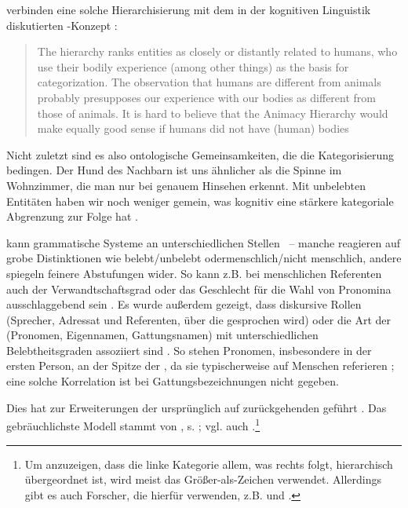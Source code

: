  \noindent
\textcite{Enger2011} verbinden eine solche Hierarchisierung mit dem in der kognitiven Linguistik diskutierten  -Konzept \parencite[vgl.][]{Lakoff1999}:
\blockcquote[208]{Enger2011}[.]{The hierarchy ranks entities as
closely or distantly related to humans, who use their bodily experience (among other things) as the basis for categorization. The observation that humans are different from animals probably presupposes our experience with our bodies as different from those of animals. It is hard to believe that the Animacy Hierarchy would make equally good sense if humans did not have (human) bodies} Nicht zuletzt sind es also ontologische Gemeinsamkeiten, die die Kategorisierung bedingen. Der Hund des Nachbarn ist uns ähnlicher als die Spinne im Wohnzimmer, die man nur bei genauem Hinsehen erkennt.
Mit unbelebten  Entitäten haben wir noch weniger gemein, was kognitiv eine stärkere kategoriale Abgrenzung zur Folge hat  \parencite[vgl. auch][16]{Yamamoto1999}.

 kann grammatische Systeme an unterschiedlichen Stellen ~-- manche reagieren auf grobe Distinktionen wie belebt/unbelebt oder\linebreak menschlich/nicht menschlich, andere spiegeln feinere Abstufungen wider. So kann z.B. bei menschlichen Referenten auch der Verwandtschaftsgrad oder das Geschlecht für die Wahl von Pronomina ausschlaggebend sein \parencite[s. ausführlich][194--197]{Comrie1989, Corbett2000}. Es wurde außerdem gezeigt, dass diskursive Rollen (Sprecher,  Adressat und Referenten, über die gesprochen wird) oder die Art der  (Pronomen, Eigennamen, Gattungsnamen)    mit unterschiedlichen Belebtheitsgraden  assoziiert sind \parencite[s. etwa][186]{Comrie1989}. So stehen   Pronomen, insbesondere in der ersten Person, an der Spitze der ,  da sie typischerweise auf Menschen referieren \parencite[s. auch][67]{Fraurud1996}; eine solche Korrelation ist bei Gattungsbezeichnungen  nicht gegeben. 

Dies hat zur Erweiterungen der ursprünglich auf \textcite{Silverstein1976} zurückgehenden   geführt \parencite[vgl. u.a.][]{Allan1987,Langacker1991,Langacker2008,Dixon1995,Corbett2000,Foley2007}. Das gebräuchlichste Modell stammt von \textcite[85]{Dixon1995}, s. ; vgl. auch \textcite[130]{Croft2006}.\footnote{Um anzuzeigen, dass die linke Kategorie allem, was rechts folgt, hierarchisch übergeordnet ist, wird meist das Größer-als-Zeichen \hervor{>} verwendet. Allerdings gibt es auch Forscher, die hierfür \hervor{<} verwenden, z.B. \textcite{Allan1987} und \textcite{Croft2006}.}  

